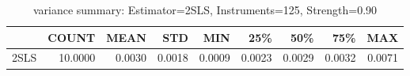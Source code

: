 \begin{table}[ht]
\centering
\caption{variance summary: Estimator=2SLS, Instruments=125, Strength=0.90}
\begin{tabular}{lrrrrrrrr}
\toprule
 & COUNT & MEAN & STD & MIN & 25\% & 50\% & 75\% & MAX \\
\midrule
2SLS & 10.0000 & 0.0030 & 0.0018 & 0.0009 & 0.0023 & 0.0029 & 0.0032 & 0.0071 \\
\bottomrule
\end{tabular}
\end{table}

